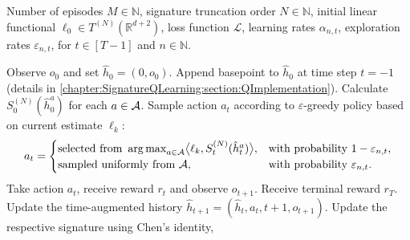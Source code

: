 \documentclass[
    a4paper,
    11pt,
    bibliography=totoc,
    listof=totoc,      
    headinclude=true,
    cleardoublepage=empty,
]{scrbook}
\theoremstyle{plain}
\theoremstyle{definition}
\theoremstyle{remark}
\newcommand{\SetR}{\mathbb R}
\newcommand{\SetN}{\mathbb N}
\newcommand{\SpaceA}{{\cal A}}
\DeclareMathOperator*{\argmax}{arg\,max}
\begin{document}
\begin{algorithm}
	\caption{Signature-Q-learning}
	\label{alg:SignatureQLearning}
	\begin{algorithmic}[1] 
		\Require Number of episodes $M\in\SetN$, signature truncation order $N\in\SetN$, initial linear functional 
            $\ell_0\in T^{(N)}(\SetR^{d+2})$, loss function $\mathcal{L}$, learning rates 
            $\alpha_{n,t}$, exploration rates $\varepsilon_{n,t}$, for
            $t\in[T-1]$ and $n\in\SetN$.
            
		
            \State Observe $o_0$ and set $\hat{h}_0 = (0,o_0)$.
                \State Append basepoint to $\hat{h}_0$ at time step $t=-1$ (details in 
                \cref{chapter:SignatureQLearning:section:QImplementation}). 
            \EndIf
            \State Calculate $S_0^{(N)}(\hat{h}^a_0)$ for each $a\in\SpaceA$.
                \State \label{alg:SignatureQLearning:EpsGreedy} 
                Sample action $a_t$ according to $\varepsilon$-greedy policy based on current estimate $\ell_k$:
                \[
                    a_t = 
                    \begin{cases}
                    \text{selected from }
                    \argmax_{a\in\SpaceA} \bigl\langle
                            \ell_k, S_t^{(N)}(\hat{h}^a_t) 
                    \bigr\rangle, 
                            & \mbox{with probability } 1-\varepsilon_{n,t}, \\
                        \text{sampled uniformly from } \SpaceA, 
                            & \mbox{with probability } \varepsilon_{n,t}. \\
                    \end{cases}
                \]
			    \State Take action $a_t$, receive reward $r_t$ and 
                    observe $o_{t+1}$.
                    \State Receive terminal reward $r_T$.
                \EndIf
                \State Update the time-augmented history 
                    $\hat{h}_{t+1} = (\hat{h}_t, a_t, t+1, o_{t+1})$.
                \State Update the respective signature
                    using Chen's identity,
                    \begin{displaymath}

\end{displaymath}
\end{algorithmic}
\end{algorithm}
\end{document}
